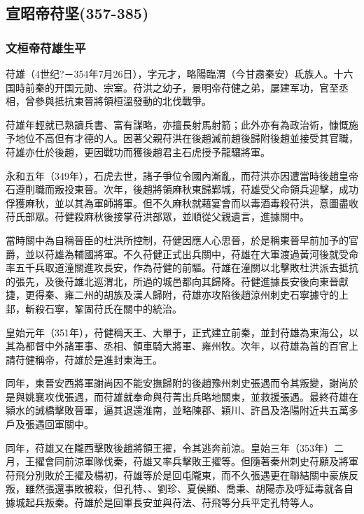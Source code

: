 
\subsection{宣昭帝苻坚\tiny(357-385)}

\subsubsection{文桓帝苻雄生平}

苻雄（4世纪?－354年7月26日），字元才，略陽臨渭（今甘肅秦安）氐族人。十六国時前秦的开国元勋、宗室。苻洪之幼子，景明帝苻健之弟，屡建军功，官至丞相，曾參與抵抗東晉將領桓溫發動的北伐戰爭。

苻雄年輕就已熟讀兵書、富有謀略，亦擅長射馬射箭；此外亦有為政治術，慷慨施予地位不高但有才德的人。因著父親苻洪在後趙滅前趙後歸附後趙並接受其官職，苻雄亦仕於後趙，更因戰功而獲後趙君主石虎授予龍驤將軍。

永和五年（349年），石虎去世，諸子爭位令國內漸亂，而苻洪亦因遭當時後趙皇帝石遵削職而叛投東晉。次年，後趙將領麻秋東歸鄴城，苻雄受父命領兵迎擊，成功俘獲麻秋，並以其為軍師將軍。但不久麻秋就藉宴會而以毒酒毒殺苻洪，意圖盡收苻氏部眾。苻健殺麻秋後接掌苻洪部眾，並順從父親遺言，進據關中。

當時關中為自稱晉臣的杜洪所控制，苻健因應人心思晉，於是稱東晉早前加予的官爵，並以苻雄為輔國將軍。不久苻健正式出兵關中，苻雄在大軍渡過黃河後就受命率五千兵取道潼關進攻長安，作為苻健的前驅。苻雄在潼關以北擊敗杜洪派去抵抗的張先，及後苻雄北巡渭北，所過的城邑都向其歸降。苻健進據長安後向東晉獻捷，更得秦、雍二州的胡族及漢人歸附，苻雄亦攻陷後趙涼州刺史石寧據守的上邽，斬殺石寧，鞏固苻氏在關中的統治。

皇始元年（351年），苻健稱天王、大單于，正式建立前秦，並封苻雄為東海公，以其為都督中外諸軍事、丞相、領車騎大將軍、雍州牧。次年，以苻雄為首的百官上請苻健稱帝，苻雄於是進封東海王。

同年，東晉安西將軍謝尚因不能安撫歸附的後趙豫州刺史張遇而令其叛變，謝尚於是與姚襄攻伐張遇，而苻雄就奉命與苻菁出兵略地關東，並救援張遇。最終苻雄在潁水的誡橋擊敗晉軍，逼其退還淮南，並略陳郡、穎川、許昌及洛陽附近共五萬多戶及張遇回軍關中。

同年，苻雄又在隴西擊敗後趙將領王擢，令其逃奔前涼。皇始三年（353年）二月，王擢會同前涼軍隊伐秦，苻雄又率兵擊敗王擢等。但隨著秦州刺史苻願及將軍苻飛分別敗於王擢及楊初，苻雄等於是回屯隴東，而不久張遇更在聯結關中豪族反叛，雖然張還事敗被殺，但孔特、、劉珍、夏侯顯、喬秉、胡陽赤及呼延毒就各自據城起兵叛秦。苻雄於是回軍長安並與苻法、苻飛等分兵平定孔特等人。


